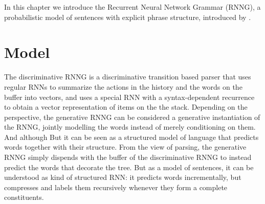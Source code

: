 % 

In this chapter we introduce the Recurrent Neural Network Grammar (RNNG), a probabilistic model of sentences with explicit phrase structure, introduced by \citet{dyer2016rnng}.

\section{Model}
The discriminative RNNG is a discriminative transition based parser that uses regular RNNs to summarize the actions in the history and the words on the buffer into vectors, and uses a special RNN with a syntax-dependent recurrence to obtain a vector representation of items on the the stack. Depending on the perspective, the generative RNNG can be considered a generative instantiation of the RNNG, jointly modelling the words instead of merely conditioning on them. And although But it can be seen as a structured model of language that predicts words together with their structure. From the view of parsing, the generative RNNG simply dispends with the buffer of the discriminative RNNG to instead predict the words that decorate the tree. But as a model of sentences, it can be understood as kind of structured RNN: it predicts words incrementally, but compresses and labels them recursively whenever they form a complete constituents.


